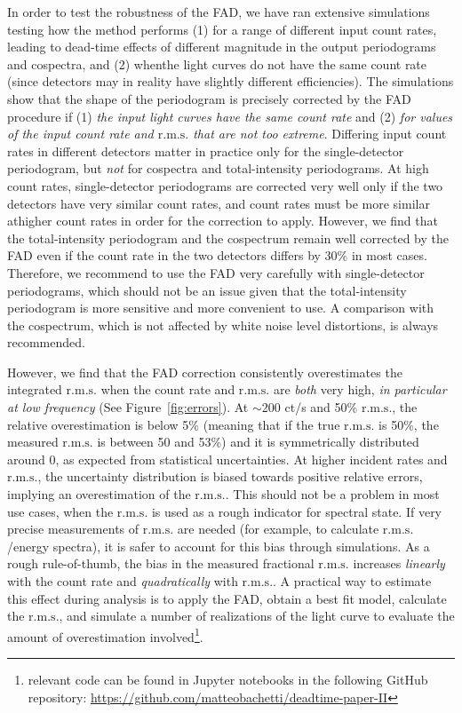 \documentclass[twocolumn]{aastex61}
\newcommand{\rms}{\ensuremath{\mathrm{r.m.s.}}\xspace}
\begin{document}
In order to test the robustness of the FAD, we have ran extensive simulations testing how the method performs (1) for a range of different input count rates, leading to dead-time effects of different magnitude in the output periodograms and cospectra, and (2) whenthe light curves do not have the same count rate (since detectors may in reality have slightly different efficiencies).
The simulations show that the shape of the periodogram is precisely corrected by the FAD procedure if (1) \textit{the input light curves have the same count rate} and (2) \textit{for values of the input count rate and \rms that are not too extreme}. Differing input count rates in different detectors matter in practice only for the single-detector periodogram, but \textit{not} for cospectra and total-intensity periodograms. 
At high count rates, single-detector periodograms are corrected very well only if the two detectors have very similar count rates, and count rates must be more similar athigher count rates in order for the correction to apply.
However, we find that the total-intensity periodogram and the cospectrum remain well corrected by the FAD even if the count rate in the two detectors differs by 30\% in most cases.
Therefore, we recommend to use the FAD very carefully with single-detector periodograms, which should not be an issue given that the total-intensity periodogram is more sensitive and more convenient to use. 
A comparison with the cospectrum, which is not affected by white noise level distortions, is always recommended. 

However, we find that the FAD correction consistently overestimates the integrated \rms when the count rate and \rms are \textit{both} very high, \textit{in particular at low frequency} (See Figure~\ref{fig:errors}).
At $\sim$200 ct/s and 50\% \rms, the relative overestimation is below 5\% (meaning that if the true \rms is 50\%, the measured \rms is between 50 and 53\%) and it is symmetrically distributed around 0, as expected from statistical uncertainties. 
At higher incident rates and \rms, the uncertainty distribution is biased towards positive relative errors, implying an overestimation of the \rms. 
This should not be a problem in most use cases, when the \rms is used as a rough indicator for spectral state.
If very precise measurements of \rms are needed (for example, to calculate \rms/energy spectra), it is safer to account for this bias through simulations.
As a rough rule-of-thumb, the bias in the measured fractional \rms increases \textit{linearly} with the count rate and \textit{quadratically} with \rms.
A practical way to estimate this effect during analysis is to apply the FAD, obtain a best fit model, calculate the \rms, and simulate a number of realizations of the light curve to evaluate the amount of overestimation involved\footnote{relevant code can be found in Jupyter notebooks in the following GitHub repository: \href{https://github.com/matteobachetti/deadtime-paper-II}{https://github.com/matteobachetti/deadtime-paper-II}}.
\end{document}
